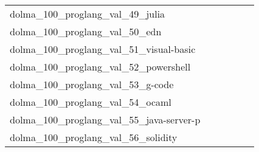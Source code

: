 {\begin{longtable}{m{6cm}m{1.7cm}m{1.7cm}m{1.7cm}m{1.7cm}m{1.7cm}}
	dolma\_100\_proglang\_val\_49\_julia  & \colorbox[HTML]{77c578}{\makebox[\mywidth][c]{3.25}} & \colorbox[HTML]{dbf1a4}{\makebox[\mywidth][c]{3.36}} & \colorbox[HTML]{ffffe5}{\makebox[\mywidth][c]{4.05}} & \colorbox[HTML]{b7e193}{\makebox[\mywidth][c]{3.30}} & \colorbox[HTML]{86cc7e}{\makebox[\mywidth][c]{3.26}}\\
	dolma\_100\_proglang\_val\_50\_edn  & \colorbox[HTML]{77c578}{\makebox[\mywidth][c]{1.99}} & \colorbox[HTML]{e4f4ab}{\makebox[\mywidth][c]{2.10}} & \colorbox[HTML]{ffffe5}{\makebox[\mywidth][c]{2.67}} & \colorbox[HTML]{b7e193}{\makebox[\mywidth][c]{2.04}} & \colorbox[HTML]{b2df90}{\makebox[\mywidth][c]{2.03}}\\
	dolma\_100\_proglang\_val\_51\_visual-basic  & \colorbox[HTML]{d7efa2}{\makebox[\mywidth][c]{2.42}} & \colorbox[HTML]{fafdcd}{\makebox[\mywidth][c]{2.49}} & \colorbox[HTML]{ffffe5}{\makebox[\mywidth][c]{2.72}} & \colorbox[HTML]{77c578}{\makebox[\mywidth][c]{2.37}} & \colorbox[HTML]{7dc87b}{\makebox[\mywidth][c]{2.38}}\\
	dolma\_100\_proglang\_val\_52\_powershell  & \colorbox[HTML]{fbfdd1}{\makebox[\mywidth][c]{4.08}} & \colorbox[HTML]{fdfede}{\makebox[\mywidth][c]{4.16}} & \colorbox[HTML]{ffffe5}{\makebox[\mywidth][c]{4.50}} & \colorbox[HTML]{77c578}{\makebox[\mywidth][c]{3.86}} & \colorbox[HTML]{aadc8d}{\makebox[\mywidth][c]{3.89}}\\
	dolma\_100\_proglang\_val\_53\_g-code  & \colorbox[HTML]{77c578}{\makebox[\mywidth][c]{2.26}} & \colorbox[HTML]{fcfdd5}{\makebox[\mywidth][c]{2.66}} & \colorbox[HTML]{ffffe5}{\makebox[\mywidth][c]{3.29}} & \colorbox[HTML]{e7f5ad}{\makebox[\mywidth][c]{2.44}} & \colorbox[HTML]{cdeb9d}{\makebox[\mywidth][c]{2.37}}\\
	dolma\_100\_proglang\_val\_54\_ocaml  & \colorbox[HTML]{77c578}{\makebox[\mywidth][c]{3.06}} & \colorbox[HTML]{ecf7b1}{\makebox[\mywidth][c]{3.29}} & \colorbox[HTML]{ffffe5}{\makebox[\mywidth][c]{4.22}} & \colorbox[HTML]{cdeb9d}{\makebox[\mywidth][c]{3.19}} & \colorbox[HTML]{b0de8f}{\makebox[\mywidth][c]{3.13}}\\
	dolma\_100\_proglang\_val\_55\_java-server-p  & \colorbox[HTML]{e2f3a9}{\makebox[\mywidth][c]{2.10}} & \colorbox[HTML]{f2fab5}{\makebox[\mywidth][c]{2.11}} & \colorbox[HTML]{ffffe5}{\makebox[\mywidth][c]{2.31}} & \colorbox[HTML]{77c578}{\makebox[\mywidth][c]{2.06}} & \colorbox[HTML]{cdeb9d}{\makebox[\mywidth][c]{2.09}}\\
	dolma\_100\_proglang\_val\_56\_solidity  & \colorbox[HTML]{9dd687}{\makebox[\mywidth][c]{4.09}} & \colorbox[HTML]{f9fcc6}{\makebox[\mywidth][c]{4.41}} & \colorbox[HTML]{ffffe5}{\makebox[\mywidth][c]{5.28}} & \colorbox[HTML]{77c578}{\makebox[\mywidth][c]{4.05}} & \colorbox[HTML]{9fd688}{\makebox[\mywidth][c]{4.10}}\\

\end{longtable}}
